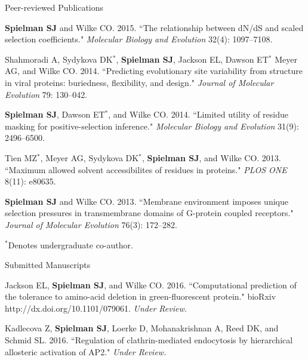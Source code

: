 \documentclass{resume} %
\begin{document}
\begin{rSection}{Peer-reviewed Publications}
\begin{etaremune}[leftmargin=1.5em]
\item \textbf{Spielman SJ} and Wilke CO. 2015. ``The relationship between dN/dS and scaled selection coefficients." \emph{Molecular Biology and Evolution} 32(4): 1097--7108.\\


\item Shahmoradi A, Sydykova DK$^\ast$, \textbf{Spielman SJ}, Jackson EL, Dawson ET$^\ast$ Meyer AG, and Wilke CO. 2014. ``Predicting evolutionary site variability from structure in viral proteins: buriedness, flexibility, and design." \emph{Journal of Molecular Evolution} 79: 130--042. \\


\item \textbf{Spielman SJ}, Dawson ET$^\ast$, and Wilke CO. 2014. ``Limited utility of residue masking for positive-selection inference." \emph{Molecular Biology and Evolution} 31(9): 2496--6500. \\


\item Tien MZ$^\ast$, Meyer AG, Sydykova DK$^\ast$, \textbf{Spielman SJ}, and Wilke CO. 2013. ``Maximum allowed solvent accessibilites of residues in proteins." \emph{PLOS ONE} 8(11): e80635. \\


\item \textbf{Spielman SJ} and Wilke CO. 2013. ``Membrane environment imposes unique selection pressures in transmembrane domains of G-protein coupled receptors." \emph{Journal of Molecular Evolution} 76(3): 172--282. \\

\end{etaremune}

$^\ast$Denotes undergraduate co-author.
\end{rSection}


\vspace*{0.35cm}
\begin{rSection}{Submitted Manuscripts}
\vspace*{0.25cm}

\begin{etaremune}[leftmargin=1.5em]

\item Jackson EL, \textbf{Spielman SJ}, and Wilke CO. 2016. ``Computational prediction of the tolerance to amino-acid deletion in green-fluorescent protein." bioRxiv http://dx.doi.org/10.1101/079061. \emph{Under Review.} \\


\item Kadlecova Z, \textbf{Spielman SJ}, Loerke D, Mohanakrishnan A, Reed DK, and Schmid SL. 2016. ``Regulation of clathrin-mediated endocytosis by hierarchical allosteric activation of AP2." \emph{Under Review.} \\

\end{etaremune}



\end{rSection}
\end{document}
